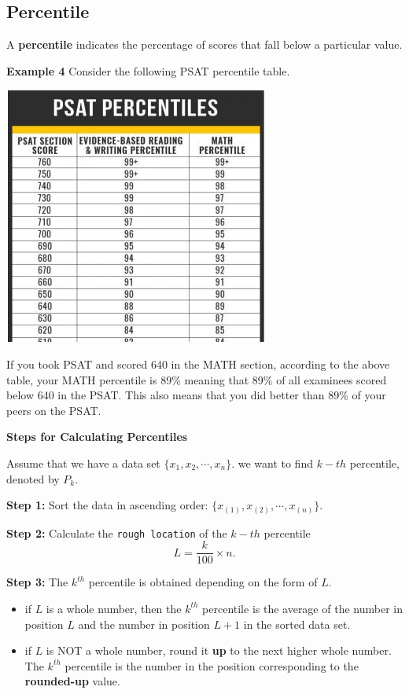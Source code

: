 \documentclass[
]{book}
\begin{document}
\hypertarget{percentile}{%
\subsection{Percentile}\label{percentile}}

A \textbf{percentile} indicates the percentage of scores that fall below a particular value.

\textbf{Example 4} Consider the following PSAT percentile table.

\begin{center}\includegraphics[width=0.45\linewidth]{week02/percentileChart} \end{center}

If you took PSAT and scored 640 in the MATH section, according to the above table, your MATH percentile is 89\% meaning that 89\% of all examinees scored below 640 in the PSAT. This also means that you did better than 89\% of your peers on the PSAT.

\textbf{Steps for Calculating Percentiles}

Assume that we have a data set \(\{ x_1, x_2, \cdots, x_n \}\). we want to find \(k-th\) percentile, denoted by \(P_k\).

\textbf{Step 1:} Sort the data in ascending order: \(\{ x_{(1)}, x_{(2)}, \cdots, x_{(n)} \}\).

\textbf{Step 2:} Calculate the \texttt{rough\ location} of the \(k-th\) percentile
\[L = \frac{k}{100}\times n.\]

\textbf{Step 3:} The \(k^{th}\) percentile is obtained depending on the form of \(L\).

\begin{itemize}
\item
  if \(L\) is a whole number, then the \(k^{th}\) percentile is the average of the number in position \(L\) and the number in position \(L+1\) in the sorted data set.
\item
  if \(L\) is NOT a whole number, round it \textbf{up} to the next higher whole number. The \(k^{th}\) percentile is the number in the position corresponding to the \textbf{rounded-up} value.
\end{itemize}
\end{document}
